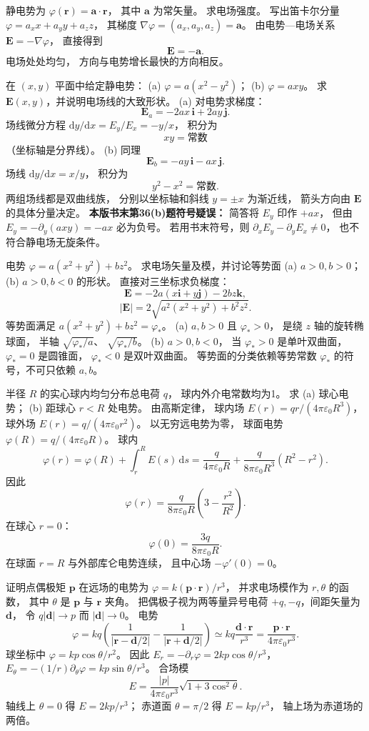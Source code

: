 静电势为 $\varphi(\bm r)=\bm a\cdot\bm r$，
其中 $\bm a$ 为常矢量。
求电场强度。
\exsolution
写出笛卡尔分量
$\varphi=a_xx+a_yy+a_zz$，
其梯度
$\nabla\varphi=(a_x,a_y,a_z)=\bm a$。
由电势—电场关系
$\bm E=-\nabla\varphi$，
直接得到
\[
\boxed{\bm E=-\bm a}.
\]
\excheck 电场处处均匀，
方向与电势增长最快的方向相反。

在 $(x,y)$ 平面中给定静电势：
(a) $\varphi=a(x^2-y^2)$；
(b) $\varphi=axy$。
求 $\bm E(x,y)$，并说明电场线的大致形状。
\exsolution
(a) 对电势求梯度：
\[
\boxed{\bm E_a=
-2ax\,\bm i+2ay\,\bm j}.
\]
场线微分方程
$\mathrm dy/\mathrm dx=E_y/E_x=-y/x$，
积分为
\[
\boxed{xy=\text{常数}}
\]
（坐标轴是分界线）。
(b) 同理
\[
\boxed{\bm E_b=-ay\,\bm i-ax\,\bm j}.
\]
场线
$\mathrm dy/\mathrm dx=x/y$，
积分为
\[
\boxed{y^2-x^2=\text{常数}}.
\]
两组场线都是双曲线族，
分别以坐标轴和斜线 $y=\pm x$ 为渐近线，
箭头方向由 $\bm E$ 的具体分量决定。
\excheck \textbf{本版书末第36(b)题符号疑误：}
简答将 $E_y$ 印作 $+ax$，
但由 $E_y=-\partial_y(axy)=-ax$ 必为负号。
若用书末符号，则
$\partial_xE_y-\partial_yE_x\ne0$，
也不符合静电场无旋条件。

电势
$\varphi=a(x^2+y^2)+bz^2$。
求电场矢量及模，并讨论等势面
(a) $a>0,b>0$；
(b) $a>0,b<0$ 的形状。
\exsolution
直接对三坐标求负梯度：
\[
\boxed{\bm E=
-2a(x\bm i+y\bm j)-2bz\bm k},
\]
\[
\boxed{|\bm E|=
2\sqrt{a^2(x^2+y^2)+b^2z^2}}.
\]
等势面满足
$a(x^2+y^2)+bz^2=\varphi_*$。
(a) $a,b>0$ 且 $\varphi_*>0$，
是绕 $z$ 轴的旋转椭球面，
半轴 $\sqrt{\varphi_*/a}$、
$\sqrt{\varphi_*/b}$。
(b) $a>0,b<0$，
当 $\varphi_*>0$ 是单叶双曲面，
$\varphi_*=0$ 是圆锥面，
$\varphi_*<0$ 是双叶双曲面。
\excheck 等势面的分类依赖等势常数 $\varphi_*$
的符号，不可只依赖 $a,b$。

半径 $R$ 的实心球内均匀分布总电荷 $q$，
球内外介电常数均为1。
求 (a) 球心电势；
(b) 距球心 $r<R$ 处电势。
\exsolution
由高斯定律，
球内场
$E(r)=qr/(4\pi\varepsilon_0R^3)$，
球外场
$E(r)=q/(4\pi\varepsilon_0r^2)$。
以无穷远电势为零，
球面电势
$\varphi(R)=q/(4\pi\varepsilon_0R)$。
球内
\[
\varphi(r)=\varphi(R)+\int_r^R E(s)\,\mathrm ds
=\frac{q}{4\pi\varepsilon_0R}
+\frac{q}{8\pi\varepsilon_0R^3}(R^2-r^2).
\]
因此
\[
\boxed{\varphi(r)=
\frac{q}{8\pi\varepsilon_0R}
\left(3-\frac{r^2}{R^2}\right)}.
\]
在球心 $r=0$：
\[
\boxed{\varphi(0)=\frac{3q}{8\pi\varepsilon_0R}}.
\]
\excheck 在球面 $r=R$ 与外部库仑电势连续，
且中心场 $-\varphi'(0)=0$。

证明点偶极矩 $\bm p$ 在远场的电势为
$\varphi=k(\bm p\cdot\bm r)/r^3$，
并求电场模作为 $r,\theta$ 的函数，
其中 $\theta$ 是 $\bm p$ 与 $\bm r$ 夹角。
\exsolution
把偶极子视为两等量异号电荷
$+q,-q$，间距矢量为 $\bm d$，
令 $q|\bm d|\to p$ 而 $|\bm d|\to0$。
电势
\[
\varphi=kq\left(
\frac1{|\bm r-\bm d/2|}
-\frac1{|\bm r+\bm d/2|}\right)
\simeq kq\frac{\bm d\cdot\bm r}{r^3}
=\boxed{\frac{\bm p\cdot\bm r}
{4\pi\varepsilon_0r^3}}.
\]
球坐标中
$\varphi=kp\cos\theta/r^2$。
因此
$E_r=-\partial_r\varphi
=2kp\cos\theta/r^3$，
$E_\theta=-(1/r)\partial_\theta\varphi
=kp\sin\theta/r^3$。
合场模
\[
\boxed{E=\frac{|p|}{4\pi\varepsilon_0r^3}
\sqrt{1+3\cos^2\theta}}.
\]
\excheck 轴线上 $\theta=0$ 得
$E=2kp/r^3$；
赤道面 $\theta=\pi/2$ 得 $E=kp/r^3$，
轴上场为赤道场的两倍。

